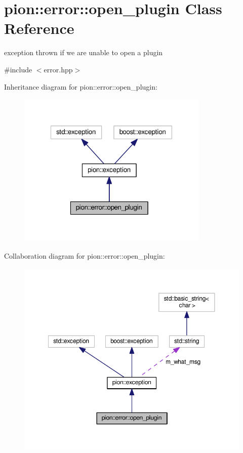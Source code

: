 \hypertarget{classpion_1_1error_1_1open__plugin}{\section{pion\-:\-:error\-:\-:open\-\_\-plugin Class Reference}
\label{classpion_1_1error_1_1open__plugin}
}


exception thrown if we are unable to open a plugin  




{\ttfamily \#include $<$error.\-hpp$>$}



Inheritance diagram for pion\-:\-:error\-:\-:open\-\_\-plugin\-:
\nopagebreak
\begin{figure}[H]
\begin{center}
\leavevmode
\includegraphics[width=259pt]{classpion_1_1error_1_1open__plugin__inherit__graph}
\end{center}
\end{figure}


Collaboration diagram for pion\-:\-:error\-:\-:open\-\_\-plugin\-:
\nopagebreak
\begin{figure}[H]
\begin{center}
\leavevmode
\includegraphics[width=350pt]{classpion_1_1error_1_1open__plugin__coll__graph}
\end{center}
\end{figure}
